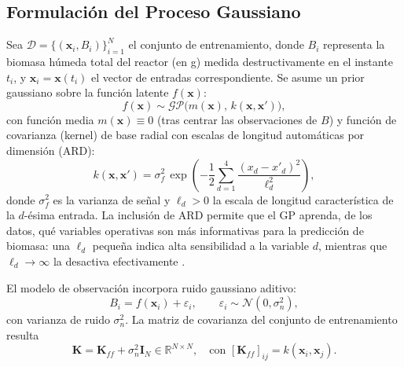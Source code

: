 \subsection{Formulación del Proceso Gaussiano}
\label{subsec:cap4_gp_formulacion}

Sea $\mathcal{D} = \{(\mathbf{x}_i, B_i)\}_{i=1}^{N}$ el conjunto de entrenamiento, donde $B_i$ representa la biomasa húmeda total del reactor (en g) medida destructivamente en el instante $t_i$, y $\mathbf{x}_i = \mathbf{x}(t_i)$ el vector de entradas correspondiente. Se asume un prior gaussiano sobre la función latente $f(\mathbf{x})$:
\begin{equation}
    \label{eq:cap4_gp_prior}
    f(\mathbf{x}) \sim \mathcal{GP}\bigl(m(\mathbf{x}),\, k(\mathbf{x}, \mathbf{x}')\bigr),
\end{equation}
con función media $m(\mathbf{x}) \equiv 0$ (tras centrar las observaciones de $B$) y función de covarianza (kernel) de base radial con escalas de longitud automáticas por dimensión (ARD):
\begin{equation}
    \label{eq:cap4_kernel_rbf_ard}
    k(\mathbf{x}, \mathbf{x}') = \sigma_f^{2}\,
    \exp\!\left(-\frac{1}{2}\sum_{d=1}^{4}\frac{(x_d - x'_d)^{2}}{\ell_d^{2}}\right),
\end{equation}
donde $\sigma_f^{2}$ es la varianza de señal y $\ell_d > 0$ la escala de longitud característica de la $d$-ésima entrada. La inclusión de ARD permite que el GP aprenda, de los datos, qué variables operativas son más informativas para la predicción de biomasa: una $\ell_d$ pequeña indica alta sensibilidad a la variable $d$, mientras que $\ell_d \to \infty$ la desactiva efectivamente \parencite{raissiPhysicsinformedNeuralNetworks2019}.

El modelo de observación incorpora ruido gaussiano aditivo:
\begin{equation}
    \label{eq:cap4_modelo_ruido}
    B_i = f(\mathbf{x}_i) + \varepsilon_i, \qquad \varepsilon_i \sim \mathcal{N}(0, \sigma_n^{2}),
\end{equation}
con varianza de ruido $\sigma_n^{2}$. La matriz de covarianza del conjunto de entrenamiento resulta
\begin{equation}
    \label{eq:cap4_matriz_covarianza}
    \mathbf{K} = \mathbf{K}_{ff} + \sigma_n^{2}\mathbf{I}_N \in \mathbb{R}^{N \times N},
    \quad \text{con } [\mathbf{K}_{ff}]_{ij} = k(\mathbf{x}_i, \mathbf{x}_j).
\end{equation}

